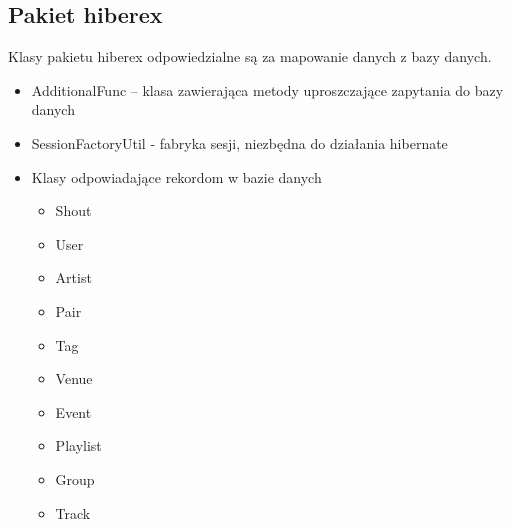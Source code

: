 \documentclass[10pt,a4paper]{article}
\begin{document}
\subsection{Pakiet hiberex}
Klasy pakietu hiberex odpowiedzialne są za mapowanie danych z bazy danych.
\begin{itemize}
\item AdditionalFunc – klasa zawierająca metody uproszczające zapytania do bazy danych
\item SessionFactoryUtil  - fabryka sesji, niezbędna do działania hibernate
\item Klasy odpowiadające rekordom w bazie danych
\begin{itemize}
\item Shout
\item User
\item Artist       
\item Pair 
\item Tag          
\item Venue
\item Event 
\item Playlist 
\item Group   
\item Track
\end{itemize}
\end{itemize}

\begin{thebibliography}{99}   
\end{thebibliography}
\end{document}
